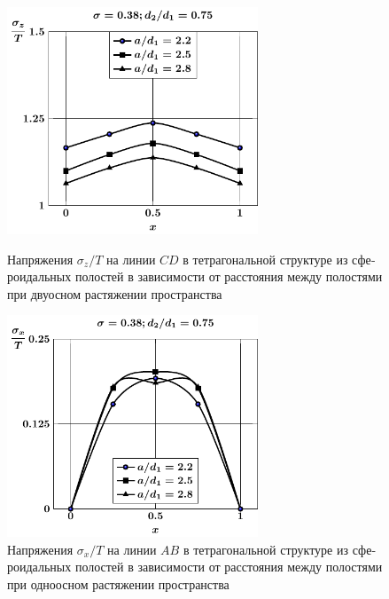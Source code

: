 \begin{russian}
\begin{figure}[h!]
\centering\footnotesize
\parbox[b]{7.5cm}{\centering\includegraphics[width=7.5cm]{cav8-a-d75-t1-sig_z-cd.pdf}
\caption{Напряжения $\sigma_z/T$ на линии $CD$ в тетрагональной структуре из сфероидальных полостей в зависимости от расстояния между полостями при двуосном растяжении пространства
\label{f:9:29}}}\hfil\hfil
\parbox[b]{7.5cm}{\centering\includegraphics[width=7.5cm]{cav8-a-d75-t1-sig_x-ab.pdf}
\caption{Напряжения $\sigma_x/T$ на линии $AB$ в тетрагональной структуре из сфероидальных полостей в зависимости от расстояния между полостями при одноосном растяжении пространства
\label{f:9:30}}}
\end{figure}

%


\end{russian}
